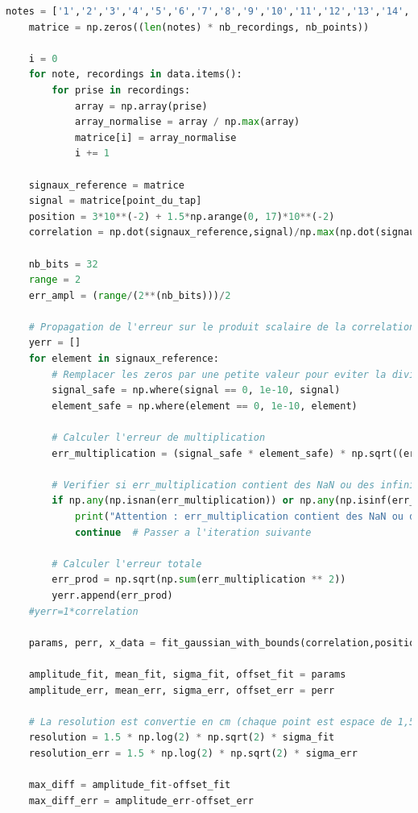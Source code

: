 ﻿\documentclass[11pt,letterpaper]{article}
\begin{document}
\begin{lstlisting}[language=python]
    notes = ['1','2','3','4','5','6','7','8','9','10','11','12','13','14','15','16','17']
    matrice = np.zeros((len(notes) * nb_recordings, nb_points))

    i = 0
    for note, recordings in data.items():
        for prise in recordings:
            array = np.array(prise)
            array_normalise = array / np.max(array)
            matrice[i] = array_normalise
            i += 1

    signaux_reference = matrice
    signal = matrice[point_du_tap]
    position = 3*10**(-2) + 1.5*np.arange(0, 17)*10**(-2)
    correlation = np.dot(signaux_reference,signal)/np.max(np.dot(signaux_reference,signal))

    nb_bits = 32
    range = 2
    err_ampl = (range/(2**(nb_bits)))/2

    # Propagation de l'erreur sur le produit scalaire de la correlation
    yerr = []
    for element in signaux_reference:
        # Remplacer les zeros par une petite valeur pour eviter la division par zero
        signal_safe = np.where(signal == 0, 1e-10, signal)
        element_safe = np.where(element == 0, 1e-10, element)

        # Calculer l'erreur de multiplication
        err_multiplication = (signal_safe * element_safe) * np.sqrt((err_ampl / signal_safe) ** 2 + (err_ampl / element_safe) ** 2)

        # Verifier si err_multiplication contient des NaN ou des infinis
        if np.any(np.isnan(err_multiplication)) or np.any(np.isinf(err_multiplication)):
            print("Attention : err_multiplication contient des NaN ou des infinis.")
            continue  # Passer a l'iteration suivante

        # Calculer l'erreur totale
        err_prod = np.sqrt(np.sum(err_multiplication ** 2))
        yerr.append(err_prod)
    #yerr=1*correlation

    params, perr, x_data = fit_gaussian_with_bounds(correlation,position, yerr)
    
    amplitude_fit, mean_fit, sigma_fit, offset_fit = params
    amplitude_err, mean_err, sigma_err, offset_err = perr

    # La resolution est convertie en cm (chaque point est espace de 1,5 cm)
    resolution = 1.5 * np.log(2) * np.sqrt(2) * sigma_fit
    resolution_err = 1.5 * np.log(2) * np.sqrt(2) * sigma_err

    max_diff = amplitude_fit-offset_fit
    max_diff_err = amplitude_err-offset_err


\end{lstlisting}
\end{document}
